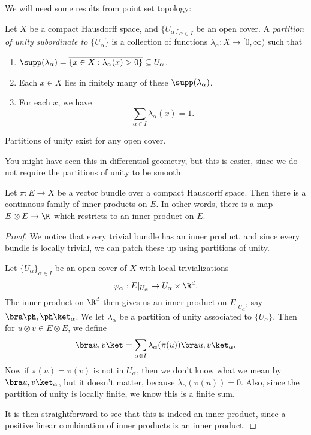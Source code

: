 \documentclass[a4paper]{article}
\begin{document}
We will need some results from point set topology:
\begin{defi}
  Let $X$ be a compact Hausdorff space, and $\{U_\alpha\}_{\alpha \in I}$ be an open cover. A \emph{partition of unity subordinate to $\{U_\alpha\}$} is a collection of functions $\lambda_\alpha: X \to [0, \infty)$ such that
  \begin{enumerate}
    \item $\supp(\lambda_\alpha) = \overline{\{x \in X: \lambda_\alpha(x) > 0\}} \subseteq U_\alpha$.
    \item Each $x \in X$ lies in finitely many of these $\supp (\lambda_\alpha)$.
    \item For each $x$, we have
      \[
        \sum_{\alpha \in I}\lambda_\alpha(x) = 1.
      \]
  \end{enumerate}
\end{defi}

\begin{prop}
  Partitions of unity exist for any open cover.
\end{prop}

You might have seen this in differential geometry, but this is easier, since we do not require the partitions of unity to be smooth.

\begin{lemma}
  Let $\pi: E \to X$ be a vector bundle over a compact Hausdorff space. Then there is a continuous family of inner products on $E$. In other words, there is a map $E \otimes E \to \R$ which restricts to an inner product on $E$.
\end{lemma}
\begin{proof}
  We notice that every trivial bundle has an inner product, and since every bundle is locally trivial, we can patch these up using partitions of unity.

  Let $\{U_\alpha\}_{\alpha \in I}$ be an open cover of $X$ with local trivializations
  \[
    \varphi_\alpha: E|_{U_\alpha} \to U_\alpha \times \R^d.
  \]
  The inner product on $\R^d$ then gives us an inner product on $E|_{U_\alpha}$, say $\bra \ph, \ph\ket_\alpha$. We let $\lambda_\alpha$ be a partition of unity associated to $\{U_\alpha\}$. Then for $u\otimes v \in E \otimes E$, we define
  \[
    \bra u, v\ket = \sum_{\alpha \in I} \lambda_\alpha(\pi(u)) \bra u, v\ket_\alpha.
  \]
  Now if $\pi(u) = \pi(v)$ is not in $U_\alpha$, then we don't know what we mean by $\bra u, v\ket_\alpha$, but it doesn't matter, because $\lambda_\alpha(\pi(u)) = 0$. Also, since the partition of unity is locally finite, we know this is a finite sum.

  It is then straightforward to see that this is indeed an inner product, since a positive linear combination of inner products is an inner product.
\end{proof}
\end{document}
